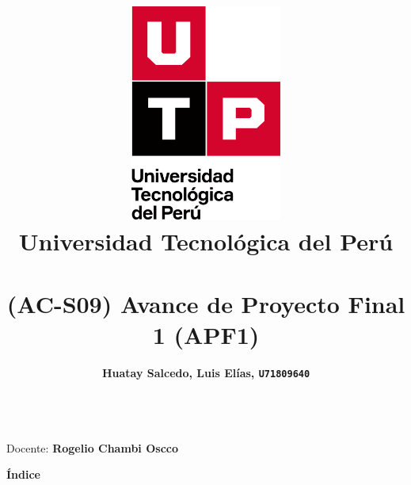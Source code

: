 \documentclass{article}
\title{
  \pagenumbering{gobble}
  \vspace{1cm}
  \includegraphics[width=5cm,clip,trim=0cm 2.9cm 0cm 0cm]{./assets/isotipo-utp.png} \\
  \vspace{0.5cm}
  \textbf{Universidad Tecnológica del Perú} \\
  \vspace{0.5cm}
  \text{Gestión de Proyectos} \\
  \vspace{1cm}
    {\huge \textbf{(AC-S09) Avance de Proyecto Final 1 (APF1)}} \\
  \vspace{1cm}
}
\author{
  \begin{tabular}{ll}
    \textbf{Huatay Salcedo, Luis Elías, \texttt{U71809640}}\\
  \end{tabular} \\
}
\begin{document}
\maketitle
\begin{center}
  Docente: \textbf{Rogelio Chambi Oscco} \\
\end{center}

%
%

\newpage

\begin{center}
\Large\bfseries Índice
\end{center}
\begingroup
\let\clearpage\relax
\renewcommand{\contentsname}{}
\tableofcontents
\endgroup


\newpage
\setcounter{page}{1}  







\end{document}
